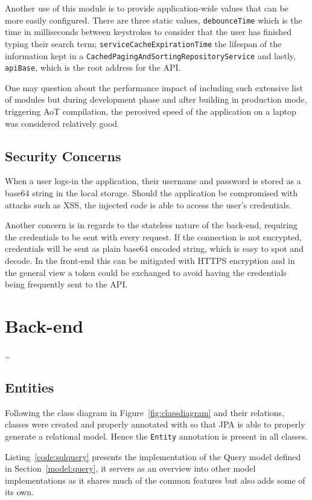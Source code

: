 Another use of this module is to provide application-wide values that can be more easily configured. There are three static values, \texttt{debounceTime} which is the time in milliseconds between keystrokes to consider that the user has finished typing their search term; \texttt{serviceCacheExpirationTime} the lifespan of the information kept in a \texttt{CachedPagingAndSortingRepositoryService} and lastly, \texttt{apiBase}, which is the root address for the \gls{API}.

One may question about the performance impact of including such extensive list of modules but during development phase and after building in production mode, triggering \gls{AoT} compilation, the perceived speed of the application on a laptop was considered relatively good.


\subsection{Security Concerns}

When a user logs-in the application, their username and password is stored as a base64 string in the local storage. Should the application be compromised with attacks such as \gls{XSS}, the injected code is able to access the user's credentials.

Another concern is in regards to the stateless nature of the back-end, requiring the credentials to be sent with every request. If the connection is not encrypted, credentials will be sent as plain base64 encoded string, which is easy to spot and decode. In the front-end this can be mitigated with \gls{HTTPS} encryption and in the general view a token could be exchanged to avoid having the credentials being frequently sent to the \gls{API}.

\section{Back-end}\label{cha:implementation:sec:back-end}
\dots

\subsection{Entities}
Following the class diagram in Figure~\ref{fig:classdiagram} and their relations, classes were created and properly annotated with so that \gls{JPA} is able to properly generate a relational model. Hence the \texttt{Entity} annotation is present in all classes.

Listing~\ref{code:sqlquery} presents the implementation of the Query model defined in Section~\ref{model:query}, it servers as an overview into other model implementations as it shares much of the common features but also adds some of its own.


